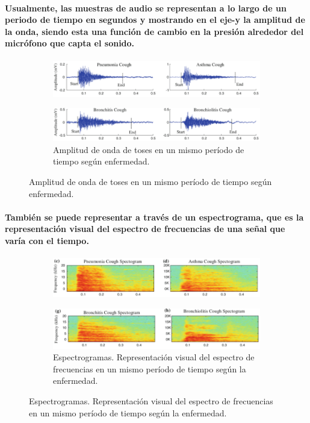 \documentclass[a4paper,11pt,twocolumn]{article}
\begin{document}
\paragraph{Usualmente, las muestras de audio se representan a lo largo de un periodo de tiempo en segundos y mostrando en el eje-y la amplitud de la onda, siendo esta una función de cambio en la presión alrededor del micrófono que capta el sonido.}
\begin{figure}[H]
\begin{subfigure}[b]{1\columnwidth}
\includegraphics[width=\linewidth, keepaspectratio]{amplitude_pneumonia_asthma}
\end{subfigure}
\begin{subfigure}[b]{1\columnwidth}
\includegraphics[width=\linewidth]{amplitude_bronchitis_bronchiolitis}
\caption{Amplitud de onda de toses en un mismo período de tiempo según enfermedad.}
\end{subfigure}
\end{figure}
\paragraph{También se puede representar a través de un espectrograma, que es la representación visual del espectro de frecuencias de una señal que varía con el tiempo\cite{espectrograma}.}
\begin{figure}[H]
\begin{subfigure}[b]{1\columnwidth}
\includegraphics[width=\textwidth]{spectogram_pneumonia_asthma}
\end{subfigure}
\begin{subfigure}[b]{1\columnwidth}
\includegraphics[width=\textwidth]{spectogram_bronchitis_bronchiolitis}
\caption{Espectrogramas. Representación visual del espectro de frecuencias en un mismo período de tiempo según la enfermedad.}
\end{subfigure}
\end{figure}
\end{document}
